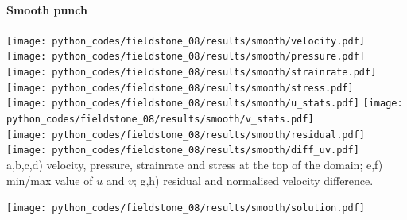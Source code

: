 \newpage
\paragraph{Smooth punch}

\begin{center}
\texttt{[image: python\_codes/fieldstone\_08/results/smooth/velocity.pdf]}
\texttt{[image: python\_codes/fieldstone\_08/results/smooth/pressure.pdf]}\\
\texttt{[image: python\_codes/fieldstone\_08/results/smooth/strainrate.pdf]}
\texttt{[image: python\_codes/fieldstone\_08/results/smooth/stress.pdf]}\\
\texttt{[image: python\_codes/fieldstone\_08/results/smooth/u\_stats.pdf]}
\texttt{[image: python\_codes/fieldstone\_08/results/smooth/v\_stats.pdf]}\\
\texttt{[image: python\_codes/fieldstone\_08/results/smooth/residual.pdf]}
\texttt{[image: python\_codes/fieldstone\_08/results/smooth/diff\_uv.pdf]}\\
{\captionfont a,b,c,d) velocity, pressure, strainrate and stress at the top of the domain; 
e,f) min/max value of $u$ and $v$;
g,h) residual and normalised velocity difference.}
\end{center}

\newpage
\texttt{[image: python\_codes/fieldstone\_08/results/smooth/solution.pdf]}




